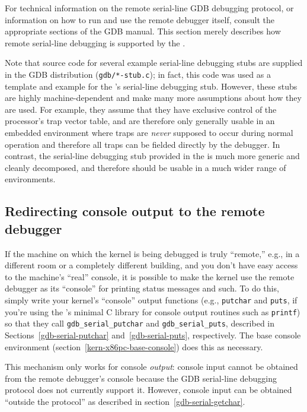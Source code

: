 For technical information on the remote serial-line GDB debugging protocol,
or information on how to run and use the remote debugger itself,
consult the appropriate sections of the GDB manual.
This section merely describes how remote serial-line debugging
is supported by the \oskit{}.

Note that source code for several example serial-line debugging stubs
are supplied in the GDB distribution ({\tt gdb/*-stub.c});
in fact, this code was used as a template and example
for the \oskit{}'s serial-line debugging stub.
However, these stubs are highly machine-dependent
and make many more assumptions about how they are used.
For example, they assume that they have exclusive control
of the processor's trap vector table,
and are therefore only generally usable in an embedded environment
where traps are \emph{never} supposed to occur during normal operation
and therefore all traps can be fielded directly by the debugger.
In contrast, the serial-line debugging stub provided in the \oskit{}
is much more generic and cleanly decomposed,
and therefore should be usable in a much wider range of environments.

\subsection{Redirecting console output to the remote debugger}
\label{gdb-serial-console}

If the machine on which the kernel is being debugged
is truly ``remote,'' e.g., in a different room
or a completely different building,
and you don't have easy access to the machine's ``real'' console,
it is possible to make the kernel use the remote debugger
as its ``console'' for printing status messages and such.
To do this, simply write your kernel's ``console'' output functions
(e.g., {\tt putchar} and {\tt puts},
if you're using the \oskit{}'s minimal C library
for console output routines such as {\tt printf})
so that they call {\tt gdb_serial_putchar} and {\tt gdb_serial_puts},
described in Sections~\ref{gdb-serial-putchar} and~\ref{gdb-serial-puts},
respectively.
The \oskit{} base console environment (section~\ref{kern-x86pc-base-console})
does this as necessary.

This mechanism only works for console \emph{output}:
console input cannot be obtained from the remote debugger's console
because the GDB serial-line debugging protocol does not currently support it.
However, console input can be obtained ``outside the protocol'' as described
in section~\ref{gdb-serial-getchar}.


